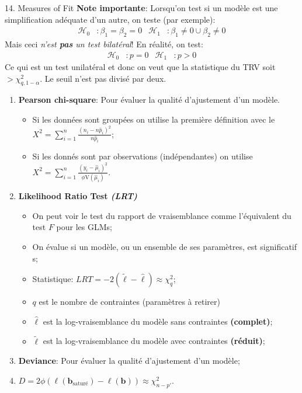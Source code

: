 \documentclass[12pt, titlepage, french]{report}
\begin{document}
\begin{CHPT_SUMM}{14. Measures of Fit}
\textbf{Note importante}: Lorsqu'on test si un modèle est une simplification adéquate d'un autre, on teste (par exemple):
\begin{align*}
	\mathcal{H}_{0}&: \beta_{1} = \beta_{2} = 0	&
	\mathcal{H}_{1}&: \beta_{1} \neq 0 \cup \beta_{2} \neq 0
\end{align*}
Mais ceci \textit{n'est \textbf{pas} un test bilatéral}! En réalité, on test:
\begin{align*}
	\mathcal{H}_{0}&: p = 0	&
	\mathcal{H}_{1}&: p > 0 
\end{align*}
Ce qui est un test unilatéral et donc on veut que la statistique du TRV soit $> \chi^{2}_{q, 1 - \alpha}$. Le seuil n'est pas divisé par deux.
\begin{enumerate}
	\item	\textbf{Pearson chi-square}: Pour évaluer la qualité d'ajustement d'un modèle.
	\begin{itemize}
		\item	Si les données sont groupées on utilise la première définition avec le $X^{2} = \sum_{i = 1}^{n}\frac{(n_{i} - n \hat{p}_{i})^{2}}{n \hat{p}_{i}}$;
		\item	Si les donnés sont par observations (indépendantes) on utilise $X^{2} = \sum_{i = 1}^{n}\frac{(y_{i} - \hat{\mu}_{i})^{2}}{\phi \text{V}(\hat{\mu}_{i})}$.
	\end{itemize}
	\item	\textbf{Likelihood Ratio Test \textit{(LRT)}}
	\begin{itemize}
		\item	On peut voir le test du rapport de vraisemblance comme l'équivalent du test $F$ pour les GLMs;
		\item[]	On évalue si un modèle, ou un ensemble de ses paramètres, est significatif	s;
		\item	Statistique: $LRT = -2(\tilde{\ell} - \hat{\ell}) \approx	\chi_{q}^{2}$;
		\item[]	$q$ est le nombre de contraintes (paramètres à retirer)
		\item[]	$\hat{\ell}$ est la log-vraisemblance du modèle sans contraintes \textbf{(complet)};
		\item[]	$\tilde{\ell}$ est la log-vraisemblance du modèle avec contraintes \textbf{(réduit)};
	\end{itemize}
	\item	\textbf{Deviance}: Pour évaluer la qualité d'ajustement d'un modèle;
	\item[]	$D = 2 \phi \left( \ell(\bm{b}_{\text{saturé}}) - \ell(\bm{b}) \right) \approx \chi^{2}_{n - p'}$.

\end{enumerate}
\end{CHPT_SUMM}
\end{document}
